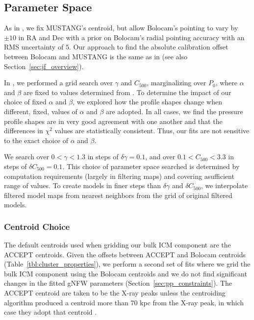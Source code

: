 \documentclass[iop,numberedappendix,apj]{emulateapj}
\begin{document}
\subsection{Parameter Space}
\label{sec:param_space}

As in \citet{romero2015a}, we fix MUSTANG's centroid, but allow Bolocam's pointing to vary by $\pm 10$\asecs 
in RA and Dec with a prior on Bolocam's radial pointing accuracy with an RMS uncertainty of $5$\asec. Our 
approach to find the absolute calibration offset between Bolocam and MUSTANG is the same as in
\citet{romero2015a} (see also Section~\ref{sec:jf_overview}). 

In \citet{romero2015a}, we performed a grid search over $\gamma$ and $C_{500}$, marginalizing over $P_0$,
where $\alpha$ and $\beta$ are fixed to values determined from . To determine the
impact of our choice of fixed $\alpha$ and $\beta$, we explored how the profile shapes change when different,
fixed, values of $\alpha$ and $\beta$ are adopted. In all cases, we find the pressure profile shapes are in very 
good agreement with one another and that the differences in $\chi^2$ values are statistically consistent. Thus, 
our fits are not sensitive to the exact choice of $\alpha$ and $\beta$.

We search over $0 < \gamma < 1.3$ in steps of $\delta \gamma = 0.1$, and over $0.1 < C_{500} < 3.3$ in steps of 
$\delta C_{500} = 0.1$. This choice of parameter space searched is determined by computation requirements (largely in
filtering maps) and covering asufficient range of values. To create models in finer steps than $\delta \gamma$ 
and $\delta C_{500}$, we interpolate filtered model maps from nearest neighbors from the grid of original 
filtered models. 

\subsubsection{Centroid Choice}
\label{sec:centroids}

The default centroids used when gridding our bulk ICM component are the ACCEPT centroids. Given the offsets
between ACCEPT and Bolocam centroids (Table~\ref{tbl:cluster_properties}), we perform a second set of
fits where we grid the bulk ICM component using the Bolocam centroids and we do not find significant changes in
the fitted gNFW parameters (Section~\ref{sec:pp_constraints}). The ACCEPT centroid are taken to be the
X-ray peaks unless the centroiding algorithm produced a centroid more than 70 kpc from the X-ray peak, in which
case they adopt that centroid \citep{cavagnolo2008a}. 
\end{document}
